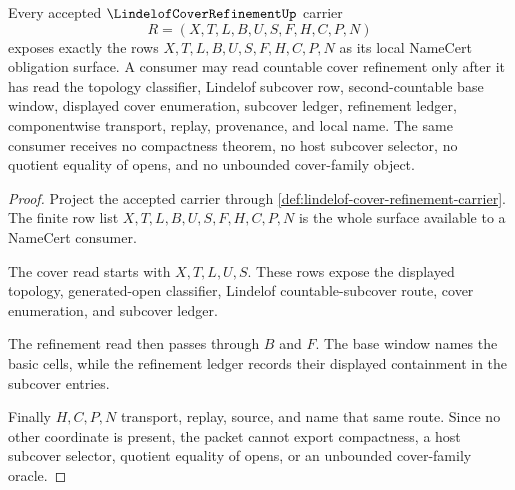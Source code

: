 \begin{theorem}
\label{thm:lindelof-cover-refinement-namecert-obligations}
Every accepted $\LindelofCoverRefinementUp$ carrier
$$
R=(X,T,L,B,U,S,F,H,C,P,N)
$$
exposes exactly the rows $X,T,L,B,U,S,F,H,C,P,N$ as its local NameCert obligation surface. A consumer may read countable cover refinement only after it has read the topology classifier, Lindelof subcover row, second-countable base window, displayed cover enumeration, subcover ledger, refinement ledger, componentwise transport, replay, provenance, and local name. The same consumer receives no compactness theorem, no host subcover selector, no quotient equality of opens, and no unbounded cover-family object.
\end{theorem}
\begin{proof}
Project the accepted carrier through \autoref{def:lindelof-cover-refinement-carrier}. The finite row list $X,T,L,B,U,S,F,H,C,P,N$ is the whole surface available to a NameCert consumer.

The cover read starts with $X,T,L,U,S$. These rows expose the displayed topology, generated-open classifier, Lindelof countable-subcover route, cover enumeration, and subcover ledger.

The refinement read then passes through $B$ and $F$. The base window names the basic cells, while the refinement ledger records their displayed containment in the subcover entries.

Finally $H,C,P,N$ transport, replay, source, and name that same route. Since no other coordinate is present, the packet cannot export compactness, a host subcover selector, quotient equality of opens, or an unbounded cover-family oracle.
\end{proof}

